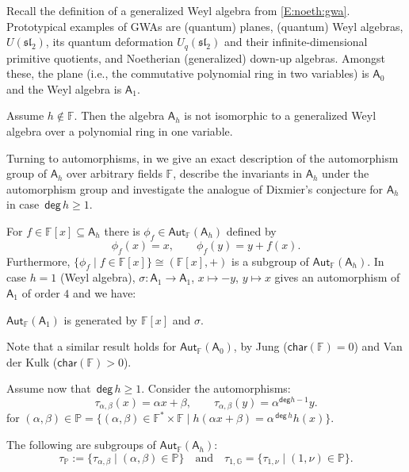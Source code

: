 \documentclass{commat}
\newcommand\ds{\displaystyle}
\newcommand{\FF}{\mathbb{F}}
\newcommand{\A}{\mathsf{A}}
\newcommand\chara{\mathsf {char}}
\newcommand\aut[1][\FF]{ \mathsf{Aut}_{#1}}
\newcommand\degg{\, \mathsf{deg} \,}
\begin{document}
Recall the definition of a generalized Weyl algebra from \eqref{E:noeth:gwa}. Prototypical examples of GWAs are (quantum) planes, (quantum) Weyl algebras, $U(\mathfrak{sl}_2)$, its quantum deformation $U_q(\mathfrak{sl}_2)$ and their infinite-dimensional primitive quotients, and Noetherian (generalized) down-up algebras. Amongst these, the plane (i.e., the commutative polynomial ring in two variables) is $\A_0$ and the Weyl algebra is $\A_1$.

\begin{theorem}
	Assume  $h \not \in\FF$. Then the algebra $\A_h$ is not isomorphic to a generalized Weyl algebra over a polynomial ring in one variable. 
\end{theorem}

Turning to automorphisms, in \cite{BLO15tams} we give an exact description of the automorphism group of $\A_h$ over arbitrary fields $\FF$, describe the invariants in $\A_h$ under the automorphism group and investigate the analogue of Dixmier’s conjecture for $\A_h$ in case $\degg h \geq 1$.

For  $f\in\FF[x]\subseteq \A_h$ there is  $\phi_f\in\aut (\A_h)$  defined by 
\begin{equation}\label{E:autos_Ah:fromlnd} \phi_f (x)=x, \qquad \phi_f (y)=y+f(x).  \end{equation} 
Furthermore, $\{ \phi_f \mid f\in\FF[x]  \} \cong \left( \FF[x], +\right)$ is a subgroup of $\aut (\A_h)$. In case $h=1$ (Weyl algebra), $\sigma : \A_{1}\rightarrow\A_{1}$, $x \mapsto -y$, $y \mapsto x$ gives an automorphism of $\A_1$ of order $4$ and we have:

\begin{theorem}[Dixmier '68 ($\chara (\FF)=0$), Makar-Limanov '84 ($\chara (\FF)>0$)]
	$\aut(\A_{1})$ is generated by $\FF[x]$ and $\sigma$. 
\end{theorem}
Note that a similar result holds for $\aut (\A_0)$, by Jung ($\chara (\FF)=0$) and Van der Kulk ($\chara (\FF)>0$).

Assume now that $\degg h\geq 1$. Consider the automorphisms:
$$  \tau_{\alpha,\beta}(x) = \alpha x + \beta, \qquad \tau_{\alpha,\beta}(y) = \alpha^{\mathsf{deg}h-1} y. $$
for $\ds  (\alpha,\beta)\in \mathbb P = \{(\alpha,\beta) \in \FF^* \times \FF \mid  h(\alpha x +\beta) = \alpha^{\degg h} h(x)\} .$

The following are subgroups of $\aut(\A_h)$:
$$\tau_{\mathbb P} :=\{ \tau_{\alpha,\beta} \mid (\alpha,\beta) \in \mathbb P\} \quad \text{and} \quad  \tau_{1,\mathbb{G}} = \{ \tau_{1, \nu} \mid (1,\nu) \in \mathbb{P} \}.$$
\end{document}

